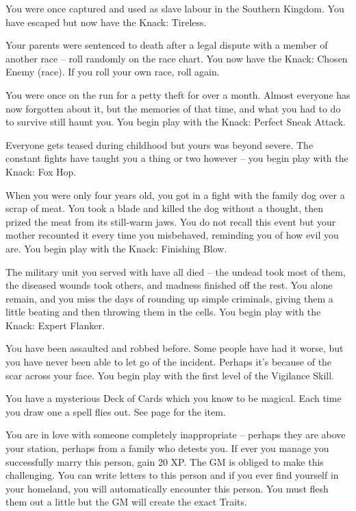 \begin{multicols}{2}
\begin{list}{\addtocounter{list}{1}\textbf{:}}{\raggedleft}
\item{You were once captured and used as slave labour in the Southern Kingdom.  You have escaped but now have the Knack: Tireless.}

\item{Your parents were sentenced to death after a legal dispute with a member of another race -- roll randomly on the race chart.  You now have the Knack: Chosen Enemy (race).  If you roll your own race, roll again.}

\item{You were once on the run for a petty theft for over a month.  Almost everyone has now forgotten about it, but the memories of that time, and what you had to do to survive still haunt you.  You begin play with the Knack: Perfect Sneak Attack.}

\item{Everyone gets teased during childhood but yours was beyond severe.  The constant fights have taught you a thing or two however -- you begin play with the Knack: Fox Hop.}

\item{When you were only four years old, you got in a fight with the family dog over a scrap of meat.  You took a blade and killed the dog without a thought, then prized the meat from its still-warm jaws.  You do not recall this event but your mother recounted it every time you misbehaved, reminding you of how evil you are.  You begin play with the Knack: Finishing Blow.}

\item{The military unit you served with have all died -- the undead took most of them, the diseased wounds took others, and madness finished off the rest.  You alone remain, and you miss the days of rounding up simple criminals, giving them a little beating and then throwing them in the cells.  You begin play with the Knack: Expert Flanker.}

\item{You have been assaulted and robbed before.  Some people have had it worse, but you have never been able to let go of the incident.  Perhaps it's because of the scar across your face.  You begin play with the first level of the Vigilance Skill.}

\item{You have a mysterious Deck of Cards which you know to be magical.  Each time you draw one a spell flies out.  See page \pageref{deckofmanythings} for the item.}

\item{You are in love with someone completely inappropriate -- perhaps they are above your station, perhaps from a family who detests you.  If ever you manage you successfully marry this person, gain 20 XP.  The GM is obliged to make this challenging.  You can write letters to this person and if you ever find yourself in your homeland, you will automatically encounter this person.  You must flesh them out a little but the GM will create the exact Traits.}


\end{list}
\end{multicols}
